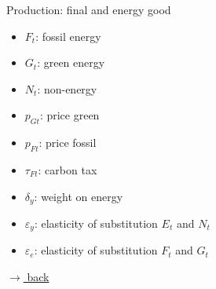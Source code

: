 \documentclass[11pt,aspectratio=169]{beamer}
\begin{document}
\begin{frame}{Production: final and energy good}
		\small
		\vspace{4mm}
		\hspace{-4mm}
		\begin{minipage}[t!]{0.24\textwidth}
			\vspace{0mm}
			\begin{itemize}	
				\item[]$F_t$: fossil energy
				\vspace{-2mm}	
				\item[]$G_t$: green energy
				\vspace{-7mm}	
				\item[]$N_t$: non-energy
			\end{itemize}
		\end{minipage}
		\begin{minipage}[t!]{0.24\textwidth}
			\vspace{0mm}
			\begin{itemize}
				\item[] $p_{Gt}$: price green  \vspace{-2mm}
				\item[] $p_{Ft}$: price fossil
				\vspace{-2mm}	
				\item[] $\tau_{Ft}$: carbon tax
			\end{itemize}
		\end{minipage}
		\begin{minipage}[t!]{0.47\textwidth}
			\vspace{0mm}
			\begin{itemize}
				\item[] $\delta_{y}$: weight on energy\vspace{-2mm}
				\item[] $\varepsilon_y$: elasticity of substitution $E_t$ and $N_t$ \vspace{-2mm}
				\item[] $\varepsilon_e$: elasticity of substitution $F_t$ and $G_t$
			\end{itemize}
		\end{minipage}

\vspace{-2mm}
\hfill \hyperlink{backScheme}{\tiny{$\rightarrow$ back}}
	\end{frame}
	
\end{document}
